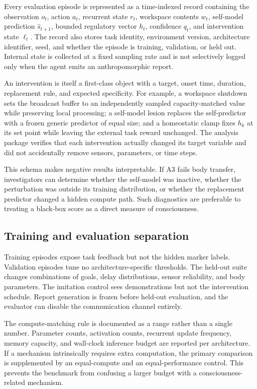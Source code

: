 \documentclass[conference]{IEEEtran}
\begin{document}
Every evaluation episode is represented as a time-indexed record containing the observation $o_t$, action $a_t$, recurrent state $r_t$, workspace contents $w_t$, self-model prediction $\hat{s}_{t+1}$, bounded regulatory vector $h_t$, confidence $q_t$, and intervention state $\ell_t$. The record also stores task identity, environment version, architecture identifier, seed, and whether the episode is training, validation, or held out. Internal state is collected at a fixed sampling rate and is not selectively logged only when the agent emits an anthropomorphic report.

An intervention is itself a first-class object with a target, onset time, duration, replacement rule, and expected specificity. For example, a workspace shutdown sets the broadcast buffer to an independently sampled capacity-matched value while preserving local processing; a self-model lesion replaces the self-predictor with a frozen generic predictor of equal size; and a homeostatic clamp fixes $h_k$ at its set point while leaving the external task reward unchanged. The analysis package verifies that each intervention actually changed its target variable and did not accidentally remove sensors, parameters, or time steps.

This schema makes negative results interpretable. If A3 fails body transfer, investigators can determine whether the self-model was inactive, whether the perturbation was outside its training distribution, or whether the replacement predictor changed a hidden compute path. Such diagnostics are preferable to treating a black-box score as a direct measure of consciousness.

\subsection{Training and evaluation separation}

Training episodes expose task feedback but not the hidden marker labels. Validation episodes tune no architecture-specific thresholds. The held-out suite changes combinations of goals, delay distributions, sensor reliability, and body parameters. The imitation control sees demonstrations but not the intervention schedule. Report generation is frozen before held-out evaluation, and the evaluator can disable the communication channel entirely.

The compute-matching rule is documented as a range rather than a single number. Parameter counts, activation counts, recurrent update frequency, memory capacity, and wall-clock inference budget are reported per architecture. If a mechanism intrinsically requires extra computation, the primary comparison is supplemented by an equal-compute and an equal-performance control. This prevents the benchmark from confusing a larger budget with a consciousness-related mechanism.
\end{document}
